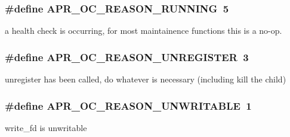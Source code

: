 \subsubsection[{\texorpdfstring{A\+P\+R\+\_\+\+O\+C\+\_\+\+R\+E\+A\+S\+O\+N\+\_\+\+R\+U\+N\+N\+I\+NG}{APR_OC_REASON_RUNNING}}]{\setlength{\rightskip}{0pt plus 5cm}\#define A\+P\+R\+\_\+\+O\+C\+\_\+\+R\+E\+A\+S\+O\+N\+\_\+\+R\+U\+N\+N\+I\+NG~5}\hypertarget{group__APR__OC_gaa4a7ca44f23d67e7e19fd59bf41abd6a}{}\label{group__APR__OC_gaa4a7ca44f23d67e7e19fd59bf41abd6a}
a health check is occurring, for most maintainence functions this is a no-\/op. 
\subsubsection[{\texorpdfstring{A\+P\+R\+\_\+\+O\+C\+\_\+\+R\+E\+A\+S\+O\+N\+\_\+\+U\+N\+R\+E\+G\+I\+S\+T\+ER}{APR_OC_REASON_UNREGISTER}}]{\setlength{\rightskip}{0pt plus 5cm}\#define A\+P\+R\+\_\+\+O\+C\+\_\+\+R\+E\+A\+S\+O\+N\+\_\+\+U\+N\+R\+E\+G\+I\+S\+T\+ER~3}\hypertarget{group__APR__OC_ga7fe88662b788e07800290f68575b2f4b}{}\label{group__APR__OC_ga7fe88662b788e07800290f68575b2f4b}
unregister has been called, do whatever is necessary (including kill the child) 
\subsubsection[{\texorpdfstring{A\+P\+R\+\_\+\+O\+C\+\_\+\+R\+E\+A\+S\+O\+N\+\_\+\+U\+N\+W\+R\+I\+T\+A\+B\+LE}{APR_OC_REASON_UNWRITABLE}}]{\setlength{\rightskip}{0pt plus 5cm}\#define A\+P\+R\+\_\+\+O\+C\+\_\+\+R\+E\+A\+S\+O\+N\+\_\+\+U\+N\+W\+R\+I\+T\+A\+B\+LE~1}\hypertarget{group__APR__OC_gae4cb4983512df7df00c9c0401efba9c9}{}\label{group__APR__OC_gae4cb4983512df7df00c9c0401efba9c9}
write\+\_\+fd is unwritable 